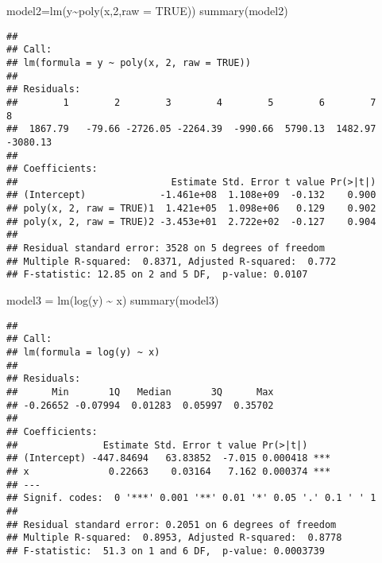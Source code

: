 \documentclass[
]{article}
\newenvironment{Shaded}{\begin{snugshade}}{\end{snugshade}}
\newcommand{\AttributeTok}[1]{\textcolor[rgb]{0.77,0.63,0.00}{#1}}
\newcommand{\ConstantTok}[1]{\textcolor[rgb]{0.00,0.00,0.00}{#1}}
\newcommand{\DecValTok}[1]{\textcolor[rgb]{0.00,0.00,0.81}{#1}}
\newcommand{\FunctionTok}[1]{\textcolor[rgb]{0.00,0.00,0.00}{#1}}
\newcommand{\NormalTok}[1]{#1}
\newcommand{\OtherTok}[1]{\textcolor[rgb]{0.56,0.35,0.01}{#1}}
\newcommand{\SpecialCharTok}[1]{\textcolor[rgb]{0.00,0.00,0.00}{#1}}
\begin{document}
\begin{Shaded}
\begin{Highlighting}[]
\NormalTok{model2}\OtherTok{=}\FunctionTok{lm}\NormalTok{(y}\SpecialCharTok{\textasciitilde{}}\FunctionTok{poly}\NormalTok{(x,}\DecValTok{2}\NormalTok{,}\AttributeTok{raw =} \ConstantTok{TRUE}\NormalTok{))}
\FunctionTok{summary}\NormalTok{(model2)}
\end{Highlighting}
\end{Shaded}

\begin{verbatim}
## 
## Call:
## lm(formula = y ~ poly(x, 2, raw = TRUE))
## 
## Residuals:
##        1        2        3        4        5        6        7        8 
##  1867.79   -79.66 -2726.05 -2264.39  -990.66  5790.13  1482.97 -3080.13 
## 
## Coefficients:
##                           Estimate Std. Error t value Pr(>|t|)
## (Intercept)             -1.461e+08  1.108e+09  -0.132    0.900
## poly(x, 2, raw = TRUE)1  1.421e+05  1.098e+06   0.129    0.902
## poly(x, 2, raw = TRUE)2 -3.453e+01  2.722e+02  -0.127    0.904
## 
## Residual standard error: 3528 on 5 degrees of freedom
## Multiple R-squared:  0.8371, Adjusted R-squared:  0.772 
## F-statistic: 12.85 on 2 and 5 DF,  p-value: 0.0107
\end{verbatim}

\begin{Shaded}
\begin{Highlighting}[]
\NormalTok{model3 }\OtherTok{=} \FunctionTok{lm}\NormalTok{(}\FunctionTok{log}\NormalTok{(y) }\SpecialCharTok{\textasciitilde{}}\NormalTok{ x)}
\FunctionTok{summary}\NormalTok{(model3)}
\end{Highlighting}
\end{Shaded}

\begin{verbatim}
## 
## Call:
## lm(formula = log(y) ~ x)
## 
## Residuals:
##      Min       1Q   Median       3Q      Max 
## -0.26652 -0.07994  0.01283  0.05997  0.35702 
## 
## Coefficients:
##               Estimate Std. Error t value Pr(>|t|)    
## (Intercept) -447.84694   63.83852  -7.015 0.000418 ***
## x              0.22663    0.03164   7.162 0.000374 ***
## ---
## Signif. codes:  0 '***' 0.001 '**' 0.01 '*' 0.05 '.' 0.1 ' ' 1
## 
## Residual standard error: 0.2051 on 6 degrees of freedom
## Multiple R-squared:  0.8953, Adjusted R-squared:  0.8778 
## F-statistic:  51.3 on 1 and 6 DF,  p-value: 0.0003739
\end{verbatim}
\end{document}

